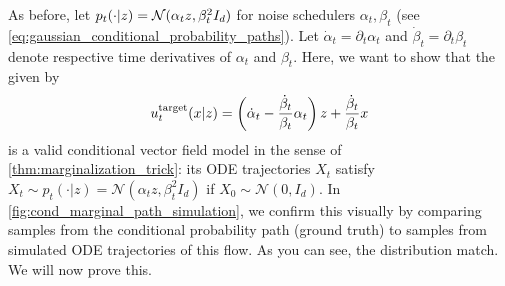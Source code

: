 \begin{examplebox}
\label{example:cond_vf_Gaussian_prob_path}
As before, let $p_t(\cdot|z) = \mathcal{N}(\alpha_t z,\beta_t^2 I_d)$ for noise schedulers $\alpha_t,\beta_t$ (see \cref{eq:gaussian_conditional_probability_paths}). Let $\dot{\alpha}_t=\partial_t\alpha_t$ and $\dot{\beta}_t=\partial_t\beta_t$ denote respective time derivatives of $\alpha_t$ and $\beta_t$. Here, we want to show that the  given by
\begin{align}
\label{eq:conditional_gaussian_vf}
    u^{\text{target}}_t(x|z) = \left(\dot{\alpha}_t-\frac{\dot{\beta}_t}{\beta_t}\alpha_t\right)z+\frac{\dot{\beta}_t}{\beta_t}x
\end{align}
is a valid conditional vector field model in the sense of \cref{thm:marginalization_trick}: its ODE trajectories $X_t$ satisfy $X_t\sim p_t(\cdot|z)=\mathcal{N}(\alpha_t z,\beta_t^2I_d)$ if $X_0\sim \mathcal{N}(0,I_d)$. In \cref{fig:cond_marginal_path_simulation}, we confirm this visually by comparing samples from the conditional probability path (ground truth) to samples from simulated ODE trajectories of this flow. As you can see, the distribution match. We will now prove this.


\end{examplebox}
